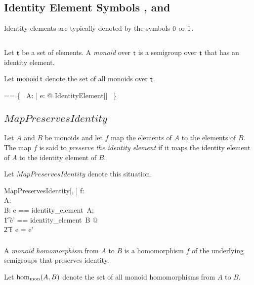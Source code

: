 \documentclass[11pt, oneside]{article}
\begin{document}
\subsection{Identity Element Symbols , and }

Identity elements are typically denoted by the symbols  $0$ or $1$.

\subsection{}

Let $\mathsf{t}$ be a set of elements.
A {\em monoid} over $\mathsf{t}$ is a semigroup over $\mathsf{t}$ that has an identity element.

Let $\operatorname{monoid} \mathsf{t}$ denote the set of all monoids over $\mathsf{t}$.

\begin{zed}
\monoid \genT == \{~ A: \semigroup \genT | \exists e: \genT @ IdentityElement[\genT] ~\}
\end{zed}


\subsection{$MapPreservesIdentity$}

Let $A$ and $B$ be monoids and let $f$ map the elements of $A$ to the elements of $B$.
The map $f$ is said to {\em preserve the identity element} if it maps the identity element of $A$
to the identity element of $B$.

Let $MapPreservesIdentity$ denote this situation.

\begin{schema}{MapPreservesIdentity}[\genT, \genU]
f: \genT \fun \genU \\
A: \monoid \genT \\
B: \monoid \genU
\where
\LET e == identity\_element~A; \\
\t1	e' == identity\_element~B @ \\
\t2		f~e = e'
\end{schema}

\subsubsection{}

A {\em monoid homomorphism} from $A$ to $B$ is a homomorphism $f$ of the underlying semigroups
that preserves identity.

Let $\operatorname{hom_{mon}}(A, B)$ denote the set of all monoid homomorphisms from $A$ to $B$.
\end{document}
